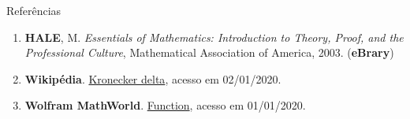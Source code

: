 \begin{frame}[fragile]{Referências}

    \begin{enumerate}
        \item \textbf{HALE}, M. \textit{Essentials of Mathematics: Introduction to Theory, Proof, and the Professional Culture}, Mathematical Association of America, 2003. (\textbf{eBrary})

        \item \textbf{Wikipédia}. \href{https://en.wikipedia.org/wiki/Kronecker_delta}{Kronecker delta}, acesso em 02/01/2020.
 
        \item \textbf{Wolfram MathWorld}. \href{http://mathworld.wolfram.com/Function.html}{Function}, acesso em 01/01/2020.

    \end{enumerate}

\end{frame}

